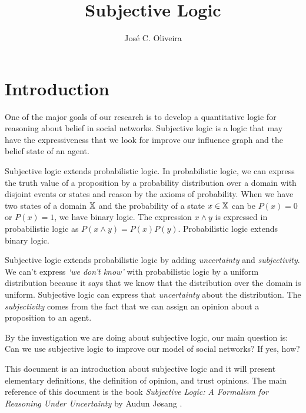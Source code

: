 \documentclass[a4paper,12pt]{article}
\title{Subjective Logic}
\author{José C. Oliveira}
\theoremstyle{definition}
\numberwithin{equation}{section}
\newcommand{\qm}[1]{`#1'}
\begin{document}
\maketitle

\section{Introduction}

One of the major goals of our research is to develop a quantitative logic for reasoning about belief in social networks. Subjective logic is a logic that may have the expressiveness that we look for improve our influence graph and the belief state of an agent.

Subjective logic extends probabilistic logic. In probabilistic logic, we can express the truth value of a proposition by a probability distribution over a domain with disjoint events or states and reason by the axioms of probability. When we have two states of a domain $\mathbb{X}$ and the probability of a state $x \in \mathbb{X}$ can be $P(x) = 0$ or $P(x) = 1$, we have binary logic. The expression $x \land y$ is expressed in probabilistic logic as $P(x \land y) = P(x)P(y)$. Probabilistic logic extends binary logic.

Subjective logic extends probabilistic logic by adding \emph{uncertainty} and \emph{subjectivity}. We can't express \emph{\qm{we don't know}} with probabilistic logic by a uniform distribution because it says that we know that the distribution over the domain is uniform. Subjective logic can express that \emph{uncertainty} about the distribution. The \emph{subjectivity} comes from the fact that we can assign an opinion about a proposition to an agent.

By the investigation we are doing about subjective logic, our main question is: Can we use subjective logic to improve our model of social networks? If yes, how?

This document is an introduction about subjective logic and it will present elementary definitions, the definition of opinion, and trust opinions. The main reference of this document is the book \emph{Subjective Logic: A Formalism for Reasoning Under Uncertainty} by Audun Jøsang \cite{josang2016subjective}.


%	
%	
%	
\end{document}
